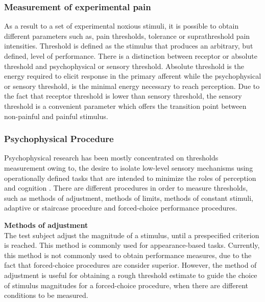 \subsubsection{Measurement of experimental pain} 
As a result to a set of experimental noxious stimuli, it is possible to obtain different parameters such as, pain thresholds, tolerance or suprathreshold pain intensities. Threshold is defined as the stimulus that produces an arbitrary, but defined, level of performance. There is a distinction between receptor or absolute threshold and psychophysical or sensory threshold. Absolute threshold is the energy required to elicit response in the primary afferent while the psychophysical or sensory threshold, is the minimal energy necessary to reach perception. Due to the fact that receptor threshold is lower than sensory threshold, the sensory threshold is a convenient parameter which offers the transition point between non-painful and painful stimulus. \cite{Yarnitsky2006}

\subsubsection{Psychophysical Procedure} 
Psychophysical research has been mostly concentrated on thresholds measurement owing to, the desire to isolate low-level sensory mechanisms using operationally defined tasks that are intended to minimize the roles of perception and cognition \cite{Pelli2010}. There are different procedures in order to measure thresholds, such as methods of adjustment, methods of limits, methods of constant stimuli, adaptive or staircase procedure and forced-choice performance procedures. 


\textbf{Methods of adjustment}
\\
The test subject adjust the magnitude of a stimulus, until a prespecified criterion is reached. This method is commonly used for appearance-based tasks. Currently, this method is not commonly used to obtain performance measures, due to the fact that forced-choice procedures are consider superior. However, the method of adjustment is useful for obtaining a rough threshold estimate to guide the choice of stimulus magnitudes for a forced-choice procedure, when there are different conditions to be measured.

